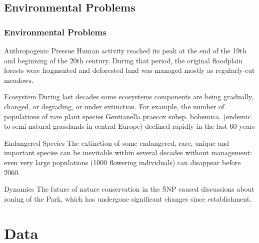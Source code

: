 \documentclass[pdflatex,compress,8pt,
	xcolor={dvipsnames,dvipsnames,svgnames,x11names,table},
	hyperref={
	breaklinks = true, 
	pdfauthor={Lemenkova Polina}, 
	pdfsubject={Preentation}, 
	pdfcreator={Lemenkova Polina}, 
	pdfproducer={Lemenkova Polina}, 
	colorlinks=true,linkcolor=blue, 
	citecolor=NavyBlue, 
	urlcolor = NavyBlue, 
	breaklinks = true}]{beamer}
\begin{document}
\subsection{Environmental Problems}
\begin{frame}\frametitle{Environmental Problems}

\begin{alertblock}{Anthropogenic Pressue}
Human activity reached its peak at the end of the 19th and beginning of the 20th century. During that period, the original floodplain forests were fragmented and deforested land was managed mostly as regularly-cut meadows.
\end{alertblock}

\begin{block}{Ecosystem}
During last decades some ecosystems components are being gradually, changed, or degrading, or under extinction. For example, the number of populations of rare plant species Gentianella praecox subsp. bohemica. (endemic to semi-natural grasslands in central Europe) declined rapidly in the last 60 years
\end{block}

\begin{examples}{Endangered Species}
The extinction of some endangered, rare, unique and important species can be inevitable within several decades without management: even very large populations (1000 flowering individuals) can disappear before 2060.
\end{examples}

\begin{block}{Dynamics}
The future of nature conservation in the ŠNP caused discussions about zoning of the Park, which has undergone significant changes since establishment.
\end{block}

\end{frame}

\section{Data}
\end{document}
